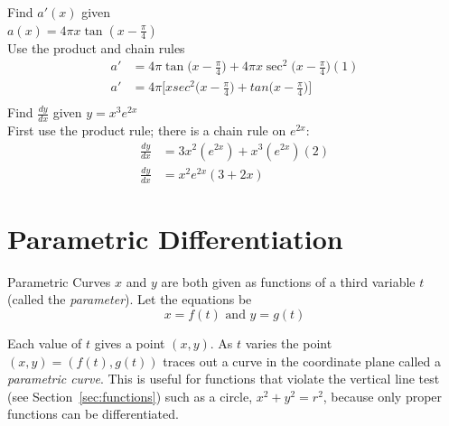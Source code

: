 \begin{multicols}{2}
\example Find $a'(x)$ given \\$a(x)= 4\pi x\tan (x-\frac{\pi}{4})$\medskip\\
\solution Use the product and chain rules \\
	\begin{align*}
	a'&= 4\pi\tan\big(x-\frac{\pi}{4}\big)+4\pi x\sec^2\big(x-\frac{\pi}{4}\big)(1) \\
	a'&= 4\pi\Big[xsec^2\big(x-\frac{\pi}{4}\big)+tan\big(x-\frac{\pi}{4}\big)\Big] \\
	\end{align*}
\examq Find $\frac{dy}{dx}$ given $y=x^3e^{2x}$\medskip\\
\solution First use the product rule; there is a chain rule on 		$e^{2x}$:\begin{align*}\frac{dy}{dx}&=3x^2(e^{2x})+x^3(e^{2x})(2) \\
	\frac{dy}{dx}&=x^2e^{2x}(3+2x)\end{align*}
\end{multicols}

\section{Parametric Differentiation}
Parametric Curves $x$ and $y$ are both given as functions of a third variable $t$ (called the \emph{parameter}). Let the equations be
\begin{equation*}x =f (t)\text{ and }y =g (t)
\end{equation*}

Each value of $t$ gives a point $(x ,y)$. As $t$ varies the point $(x ,y) =(f (t) ,g (t))$ traces out a curve in the coordinate plane called a \emph{parametric curve}. This is useful for functions that violate the vertical line test (see Section~\ref{sec:functions}) such as a circle, $x^2+y^2=r^2$, because only proper functions can be differentiated.


